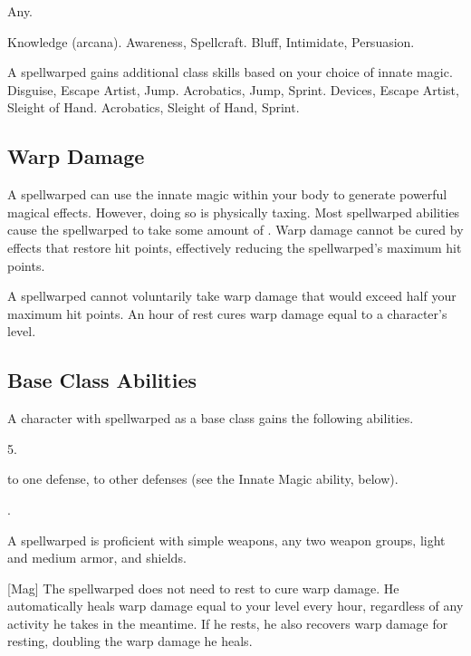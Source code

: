      Any.

     Knowledge (arcana).
     Awareness, Spellcraft.
     Bluff, Intimidate, Persuasion.

    A spellwarped gains additional class skills based on your choice of innate magic.
     Disguise, Escape Artist, Jump.
     Acrobatics, Jump, Sprint.
     Devices, Escape Artist, Sleight of Hand.
     Acrobatics, Sleight of Hand, Sprint.

    \subsection{Warp Damage}\label{Warp Damage}
        A spellwarped can use the innate magic within your body to generate powerful magical effects.
        However, doing so is physically taxing.
        Most spellwarped abilities cause the spellwarped to take some amount of .
        Warp damage cannot be cured by effects that restore hit points, effectively reducing the spellwarped's maximum hit points.

        A spellwarped cannot voluntarily take warp damage that would exceed half your maximum hit points.
        An hour of rest cures warp damage equal to a character's level.

    \subsection{Base Class Abilities}
        A character with spellwarped as a base class gains the following abilities.

         5.

          to one defense,  to other defenses (see the Innate Magic ability, below).

         .

        A spellwarped is proficient with simple weapons, any two weapon groups, light and medium armor, and shields.

        [Mag]
        The spellwarped does not need to rest to cure warp damage.
        He automatically heals warp damage equal to your level every hour, regardless of any activity he takes in the meantime.
        If he rests, he also recovers warp damage for resting, doubling the warp damage he heals.

